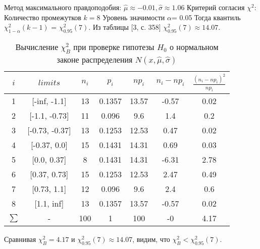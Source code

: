 \documentclass{article}
\begin{document}
\noindent Метод максимального правдоподобия:
\newline
$\hat{\mu} \approx -0.01, \hat{\sigma} \approx 1.06$
\newline
Критерий согласия $\chi^{2}$:
\newline
Количество промежутков $k = 8$
\newline
Уровень значимости $\alpha$= 0.05
\newline
Тогда квантиль $\chi^{2}_{1-\alpha}(k-1)$ = $\chi^{2}_{0.95}(7)$. Из таблицы [3, с. 358] $\chi^{2}_{0.95}(7) \approx 14.07$. 
\begin{table}[H]
	\centering
	\begin{tabular}{| c | c | c | c | c | c | c |}
		\hline
		$i$ & $limits$         &   $n_i$ &    $p_i$ &   $np_i$ &   $n_i - np_i$ &   $\frac{(n_i-np_i)^2}{np_i}$ \\
	\hline
   1 & [-inf, -1.1] &    13 & 0.1357 &  13.57 &        -0.57 &                        0.02 \\
   2 & [-1.1, -0.73]  &    11 & 0.096  &   9.6  &         1.4  &                        0.2  \\
   3 & [-0.73, -0.37] &    13 & 0.1253 &  12.53 &         0.47 &                        0.02 \\
   4 & [-0.37, 0.0]   &    15 & 0.1431 &  14.31 &         0.69 &                        0.03 \\
   5 & [0.0, 0.37]    &     8 & 0.1431 &  14.31 &        -6.31 &                        2.78 \\
   6 & [0.37, 0.73]   &    15 & 0.1253 &  12.53 &         2.47 &                        0.49 \\
   7 & [0.73, 1.1]    &    12 & 0.096  &   9.6  &         2.4  &                        0.6  \\
   8 & [1.1, inf]   &    13 & 0.1357 &  13.57 &        -0.57 &                        0.02 \\
   $\sum$ & -              &   100 & 1      & 100    &        -0    &                        4.17 \\
\hline
	\end{tabular}
	\caption{ Вычисление $\chi^{2}_{B}$ при проверке гипотезы $H_{0}$ о нормальном законе распределения $N(x,\hat{\mu}, \hat{\sigma})$}
	\label{tab:normal_chi_2}
\end{table} 

\noindent Сравнивая $\chi^{2}_{B} = 4.17$ и $\chi^{2}_{0.95}(7) \approx 14.07$, видим, что $\chi^{2}_{B} < \chi^{2}_{0.95}(7)$.
\\
\end{document}
